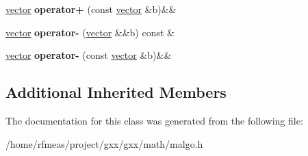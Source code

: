 \begin{DoxyCompactItemize}
\item 
\hyperlink{classmalgo_1_1vector}{vector} {\bfseries operator+} (const \hyperlink{classmalgo_1_1vector}{vector} \&b)\&\&\hypertarget{classmalgo_1_1vector_a625b2ac477dbb6c1c2145f3ae05d8c57}{}\label{classmalgo_1_1vector_a625b2ac477dbb6c1c2145f3ae05d8c57}

\item 
\hyperlink{classmalgo_1_1vector}{vector} {\bfseries operator-\/} (\hyperlink{classmalgo_1_1vector}{vector} \&\&b) const \&\hypertarget{classmalgo_1_1vector_ab8227ae40f3d59d72c4872997400c4ba}{}\label{classmalgo_1_1vector_ab8227ae40f3d59d72c4872997400c4ba}

\item 
\hyperlink{classmalgo_1_1vector}{vector} {\bfseries operator-\/} (const \hyperlink{classmalgo_1_1vector}{vector} \&b)\&\&\hypertarget{classmalgo_1_1vector_aa711189daa421fc0d9f9bbda23ba2e59}{}\label{classmalgo_1_1vector_aa711189daa421fc0d9f9bbda23ba2e59}

\end{DoxyCompactItemize}
\subsection*{Additional Inherited Members}


The documentation for this class was generated from the following file\+:\begin{DoxyCompactItemize}
\item 
/home/rfmeas/project/gxx/gxx/math/malgo.\+h\end{DoxyCompactItemize}
